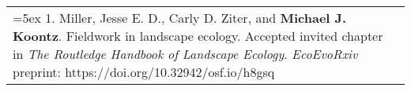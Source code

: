 \begin{longtable}{@{} >{\raggedright}p{5.25in} >{\raggedleft}X @{}}

\hangindent=5ex 1. Miller, Jesse E. D., Carly D. Ziter, and \textbf{Michael J. Koontz}. Fieldwork in landscape ecology. Accepted invited chapter in \emph{The Routledge Handbook of Landscape Ecology}. \newline \emph{EcoEvoRxiv} preprint: https://doi.org/10.32942/osf.io/h8gsq & 2020 \tabularnewline

\end{longtable}
